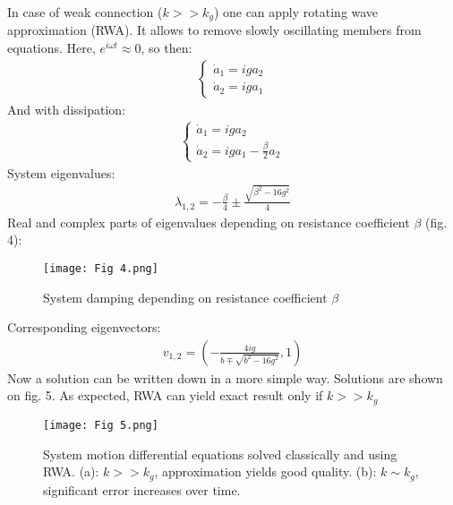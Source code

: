 \documentclass[]{article}
\begin{document}
In case of weak connection ($k>>k_g$) one can apply rotating wave approximation (RWA). It allows to remove slowly oscillating members from equations. Here, $e^{i\omega t} \approx 0$, so then:
\begin{align*}
	\begin{cases}
		\dot a_1 = iga_2
		\\
		\dot a_2 = iga_1
	\end{cases}
\end{align*}
And with dissipation:
\begin{align*}
	\begin{cases}
		\dot a_1 = iga_2
		\\
		\dot a_2 = iga_1 - \frac{\beta}{2}a_2 
	\end{cases}
\end{align*}
System eigenvalues:
\begin{align*}
	\lambda_{1,2} = -\frac{\beta}{4} \pm \frac{\sqrt{\beta^2-16g^2}}{4}
\end{align*}
Real and complex parts of eigenvalues depending on resistance coefficient $\beta$ (fig. 4):
\begin{figure}[h]
	\centering
	\texttt{[image: Fig 4.png]}
	\caption{System damping depending on resistance coefficient $\beta$}
\end{figure}\newline
Corresponding eigenvectors:
\begin{align*}
		v_{1,2} = \left(-\frac{4ig}{b \mp \sqrt{b^2-16g^2}}, 1	\right)
\end{align*}
Now a solution can be written down in a more simple way. Solutions are shown on fig. 5. As expected, RWA can yield exact result only if $k>>k_g$
\begin{figure}[h]
	\centering
	\texttt{[image: Fig 5.png]}
	\caption{System motion differential equations solved classically and using RWA. (a): {$k>>k_g$}, approximation yields good quality. (b): {$k \sim k_g$}, significant error increases over time.}
\end{figure}
\end{document}

